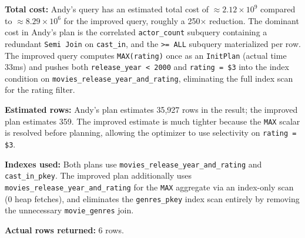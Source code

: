 \documentclass[12pt,letterpaper, onecolumn]{exam}
\begin{document}
\begin{questions}
\begin{parts}
\begin{enumerate}
\begin{solution}
        \textbf{Total cost:} Andy's query has an estimated total cost of $\approx 2.12\times10^9$ compared to $\approx 8.29\times10^6$ for the improved query, roughly a 250$\times$ reduction. The dominant cost in Andy's plan is the correlated \texttt{actor\_count} subquery containing a redundant \texttt{Semi Join} on \texttt{cast\_in}, and the \texttt{>= ALL} subquery materialized per row. The improved query computes \texttt{MAX(rating)} once as an \texttt{InitPlan} (actual time 33ms) and pushes both \texttt{release\_year < 2000} and \texttt{rating = \$3} into the index condition on \texttt{movies\_release\_year\_and\_rating}, eliminating the full index scan for the rating filter.

        \textbf{Estimated rows:} Andy's plan estimates 35,927 rows in the result; the improved plan estimates 359. The improved estimate is much tighter because the \texttt{MAX} scalar is resolved before planning, allowing the optimizer to use selectivity on \texttt{rating = \$3}.

        \textbf{Indexes used:} Both plans use \texttt{movies\_release\_year\_and\_rating} and \texttt{cast\_in\_pkey}. The improved plan additionally uses \texttt{movies\_release\_year\_and\_rating} for the \texttt{MAX} aggregate via an index-only scan (0 heap fetches), and eliminates the \texttt{genres\_pkey} index scan entirely by removing the unnecessary \texttt{movie\_genres} join.

        \textbf{Actual rows returned:} 6 rows.
      \end{solution}
    \end{enumerate}
    \pagebreak

\end{parts}
\end{questions}
\end{document}
